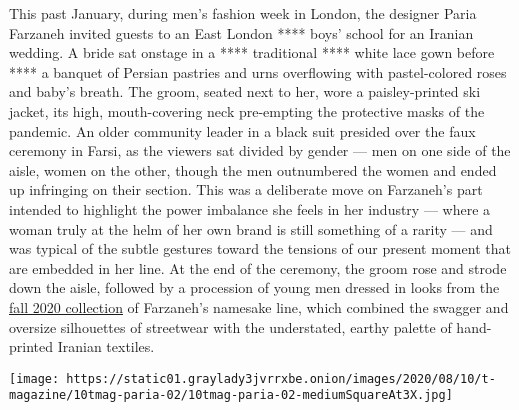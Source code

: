 This past January, during men's fashion week in London, the designer
Paria Farzaneh invited guests to an East London **** boys' school for an
Iranian wedding. A bride sat onstage in a **** traditional **** white
lace gown before **** a banquet of Persian pastries and urns overflowing
with pastel-colored roses and baby's breath. The groom, seated next to
her, wore a paisley-printed ski jacket, its high, mouth-covering neck
pre-empting the protective masks of the pandemic. An older community
leader in a black suit presided over the faux ceremony in Farsi, as the
viewers sat divided by gender --- men on one side of the aisle, women on
the other, though the men outnumbered the women and ended up infringing
on their section. This was a deliberate move on Farzaneh's part intended
to highlight the power imbalance she feels in her industry --- where a
woman truly at the helm of her own brand is still something of a rarity
--- and was typical of the subtle gestures toward the tensions of our
present moment that are embedded in her line. At the end of the
ceremony, the groom rose and strode down the aisle, followed by a
procession of young men dressed in looks from the
\href{https://www.pariafarzaneh.com/aw20}{fall 2020 collection} of
Farzaneh's namesake line, which combined the swagger and oversize
silhouettes of streetwear with the understated, earthy palette of
hand-printed Iranian textiles.

\texttt{[image: https://static01.graylady3jvrrxbe.onion/images/2020/08/10/t-magazine/10tmag-paria-02/10tmag-paria-02-mediumSquareAt3X.jpg]}

